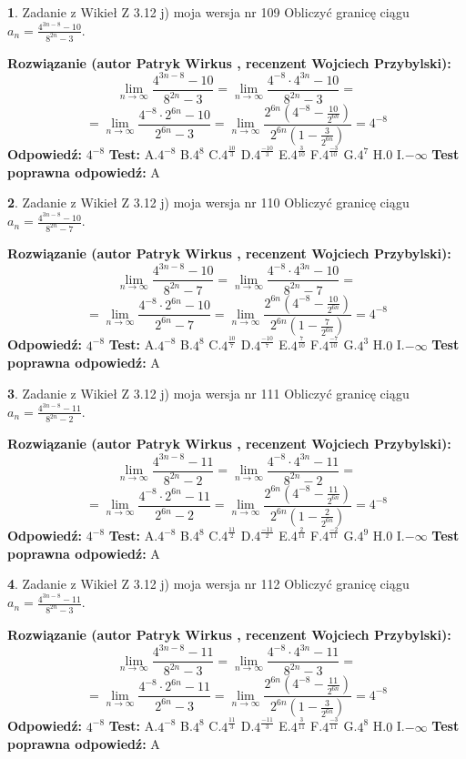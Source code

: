 \documentclass[12pt, a4paper]{article}
\theoremstyle{definition} %
\newtheorem{zad}{}
\newcommand{\zadStart}[1]{\begin{zad}#1\newline}
\newcommand{\zadStop}{\end{zad}}
\newcommand{\rozwStart}[2]{\noindent \textbf{Rozwiązanie (autor #1 , recenzent #2): }\newline}
\newcommand{\rozwStop}{\newline}
\newcommand{\odpStart}{\noindent \textbf{Odpowiedź:}\newline}
\newcommand{\odpStop}{\newline}
\newcommand{\testStart}{\noindent \textbf{Test:}\newline}
\newcommand{\testStop}{\newline}
\newcommand{\kluczStart}{\noindent \textbf{Test poprawna odpowiedź:}\newline}
\newcommand{\kluczStop}{\newline}
\begin{document}
\zadStart{Zadanie z Wikieł Z 3.12 j) moja wersja nr 109}
Obliczyć granicę ciągu $a_{n}=\frac{4^{3n-8}-10}{8^{2n}-3}$.
\zadStop
\rozwStart{Patryk Wirkus}{Wojciech Przybylski}
$$\lim\limits_{n\to\infty}\frac{4^{3n-8}-10}{8^{2n}-3}= \lim\limits_{n\to\infty}\frac{4^{-8} \cdot 4^{3n}-10}{8^{2n}-3}=$$
$$= \lim\limits_{n\to\infty}\frac{4^{-8} \cdot 2^{6n}-10}{2^{6n}-3}= \lim\limits_{n\to\infty}\frac{2^{6n}(4^{-8} - \frac{10}{2^{6n}})}{2^{6n}(1-\frac{3}{2^{6n}})}= 4^{-8}$$
\rozwStop
\odpStart
$4^{-8}$
\odpStop
\testStart
A.$4^{-8}$
B.$4^{8}$
C.$4^{\frac{10}{3}}$
D.$4^{\frac{-10}{3}}$
E.$4^{\frac{3}{10}}$
F.$4^{\frac{-3}{10}}$
G.$4^{7}$
H.$0$
I.$-\infty$
\testStop
\kluczStart
A
\kluczStop



\zadStart{Zadanie z Wikieł Z 3.12 j) moja wersja nr 110}
Obliczyć granicę ciągu $a_{n}=\frac{4^{3n-8}-10}{8^{2n}-7}$.
\zadStop
\rozwStart{Patryk Wirkus}{Wojciech Przybylski}
$$\lim\limits_{n\to\infty}\frac{4^{3n-8}-10}{8^{2n}-7}= \lim\limits_{n\to\infty}\frac{4^{-8} \cdot 4^{3n}-10}{8^{2n}-7}=$$
$$= \lim\limits_{n\to\infty}\frac{4^{-8} \cdot 2^{6n}-10}{2^{6n}-7}= \lim\limits_{n\to\infty}\frac{2^{6n}(4^{-8} - \frac{10}{2^{6n}})}{2^{6n}(1-\frac{7}{2^{6n}})}= 4^{-8}$$
\rozwStop
\odpStart
$4^{-8}$
\odpStop
\testStart
A.$4^{-8}$
B.$4^{8}$
C.$4^{\frac{10}{7}}$
D.$4^{\frac{-10}{7}}$
E.$4^{\frac{7}{10}}$
F.$4^{\frac{-7}{10}}$
G.$4^{3}$
H.$0$
I.$-\infty$
\testStop
\kluczStart
A
\kluczStop



\zadStart{Zadanie z Wikieł Z 3.12 j) moja wersja nr 111}
Obliczyć granicę ciągu $a_{n}=\frac{4^{3n-8}-11}{8^{2n}-2}$.
\zadStop
\rozwStart{Patryk Wirkus}{Wojciech Przybylski}
$$\lim\limits_{n\to\infty}\frac{4^{3n-8}-11}{8^{2n}-2}= \lim\limits_{n\to\infty}\frac{4^{-8} \cdot 4^{3n}-11}{8^{2n}-2}=$$
$$= \lim\limits_{n\to\infty}\frac{4^{-8} \cdot 2^{6n}-11}{2^{6n}-2}= \lim\limits_{n\to\infty}\frac{2^{6n}(4^{-8} - \frac{11}{2^{6n}})}{2^{6n}(1-\frac{2}{2^{6n}})}= 4^{-8}$$
\rozwStop
\odpStart
$4^{-8}$
\odpStop
\testStart
A.$4^{-8}$
B.$4^{8}$
C.$4^{\frac{11}{2}}$
D.$4^{\frac{-11}{2}}$
E.$4^{\frac{2}{11}}$
F.$4^{\frac{-2}{11}}$
G.$4^{9}$
H.$0$
I.$-\infty$
\testStop
\kluczStart
A
\kluczStop



\zadStart{Zadanie z Wikieł Z 3.12 j) moja wersja nr 112}
Obliczyć granicę ciągu $a_{n}=\frac{4^{3n-8}-11}{8^{2n}-3}$.
\zadStop
\rozwStart{Patryk Wirkus}{Wojciech Przybylski}
$$\lim\limits_{n\to\infty}\frac{4^{3n-8}-11}{8^{2n}-3}= \lim\limits_{n\to\infty}\frac{4^{-8} \cdot 4^{3n}-11}{8^{2n}-3}=$$
$$= \lim\limits_{n\to\infty}\frac{4^{-8} \cdot 2^{6n}-11}{2^{6n}-3}= \lim\limits_{n\to\infty}\frac{2^{6n}(4^{-8} - \frac{11}{2^{6n}})}{2^{6n}(1-\frac{3}{2^{6n}})}= 4^{-8}$$
\rozwStop
\odpStart
$4^{-8}$
\odpStop
\testStart
A.$4^{-8}$
B.$4^{8}$
C.$4^{\frac{11}{3}}$
D.$4^{\frac{-11}{3}}$
E.$4^{\frac{3}{11}}$
F.$4^{\frac{-3}{11}}$
G.$4^{8}$
H.$0$
I.$-\infty$
\testStop
\kluczStart
A
\kluczStop
\end{document}
